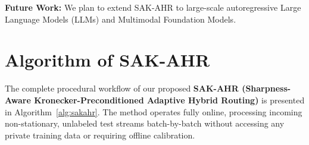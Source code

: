 \documentclass{article}
\theoremstyle{plain}
\theoremstyle{definition}
\theoremstyle{remark}
\begin{document}
\textbf{Future Work:} We plan to extend SAK-AHR to large-scale autoregressive Large Language Models (LLMs) and Multimodal Foundation Models.




\newpage
\appendix
\onecolumn
\section{Algorithm of SAK-AHR}
\label{appendix:algorithm}

The complete procedural workflow of our proposed \textbf{SAK-AHR (Sharpness-Aware Kronecker-Preconditioned Adaptive Hybrid Routing)} is presented in Algorithm~\ref{alg:sakahr}. The method operates fully online, processing incoming non-stationary, unlabeled test streams batch-by-batch without accessing any private training data or requiring offline calibration.
\end{document}
